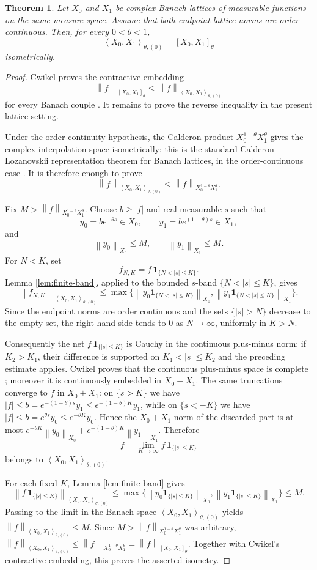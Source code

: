 \documentclass[11pt]{article}
\newtheorem{theorem}{Theorem}
\newcommand{\PM}{\left\langle X_0,X_1\right\rangle_{\theta,(0)}}
\newcommand{\Cplx}{\left[X_0,X_1\right]_\theta}
\newcommand{\Cal}{X_0^{1-\theta}X_1^\theta}
\newcommand{\norm}[1]{\left\lVert #1\right\rVert}
\newcommand{\one}{\mathbf 1}
\begin{document}
\begin{theorem}
\label{thm:order-continuous}
Let $X_0$ and $X_1$ be complex Banach lattices of measurable functions
on the same measure space.  Assume that both endpoint lattice norms are
order continuous.  Then, for every $0<\theta<1$,
\[
\left\langle X_0,X_1\right\rangle_{\theta,(0)}
=
\left[X_0,X_1\right]_\theta
\]
isometrically.
\end{theorem}

\begin{proof}
Cwikel proves the contractive embedding
\[
\norm{f}_{\Cplx}\le \norm{f}_{\PM}
\]
for every Banach couple \cite[Theorem 4.3]{Cwikel2015}.  It remains to
prove the reverse inequality in the present lattice setting.

Under the order-continuity hypothesis, the Calderon product
$\Cal$ gives the complex interpolation space isometrically; this is the
standard Calderon-Lozanovskii representation theorem for Banach
lattices, in the order-continuous case \cite{Calderon1964,Lozanovskii1969}.
It is therefore enough to prove
\[
\norm{f}_{\PM}\le \norm{f}_{\Cal}.
\]

Fix $M>\norm{f}_{\Cal}$.  Choose $b\ge |f|$ and real measurable $s$
such that
\[
y_0=b e^{-\theta s}\in X_0,\qquad
y_1=b e^{(1-\theta)s}\in X_1,
\]
and
\[
\norm{y_0}_{X_0}\le M,\qquad
\norm{y_1}_{X_1}\le M .
\]
For $N<K$, set
\[
f_{N,K}=f\,\one_{\{N<|s|\le K\}} .
\]
Lemma \ref{lem:finite-band}, applied to the bounded $s$-band
$\{N<|s|\le K\}$, gives
\[
\norm{f_{N,K}}_{\PM}
\le
\max\{\norm{y_0\one_{\{N<|s|\le K\}}}_{X_0},
      \norm{y_1\one_{\{N<|s|\le K\}}}_{X_1}\}.
\]
Since the endpoint norms are order continuous and the sets
$\{|s|>N\}$ decrease to the empty set, the right hand side tends to
$0$ as $N\to\infty$, uniformly in $K>N$.

Consequently the net $f\,\one_{\{|s|\le K\}}$ is Cauchy in the
continuous plus-minus norm: if $K_2>K_1$, their difference is supported
on $K_1<|s|\le K_2$ and the preceding estimate applies.  Cwikel proves
that the continuous plus-minus space is complete
\cite[Section 5]{Cwikel2015}; moreover it is continuously embedded in
$X_0+X_1$.  The same truncations converge to $f$ in $X_0+X_1$: on
$\{s>K\}$ we have $|f|\le b=e^{-(1-\theta)s}y_1\le
e^{-(1-\theta)K}y_1$, while on $\{s<-K\}$ we have
$|f|\le b=e^{\theta s}y_0\le e^{-\theta K}y_0$.  Hence the
$X_0+X_1$-norm of the discarded part is at most
$e^{-\theta K}\norm{y_0}_{X_0}+e^{-(1-\theta)K}\norm{y_1}_{X_1}$.
Therefore
\[
f=\lim_{K\to\infty} f\,\one_{\{|s|\le K\}}
\]
belongs to $\PM$.

For each fixed $K$, Lemma \ref{lem:finite-band} gives
\[
\norm{f\,\one_{\{|s|\le K\}}}_{\PM}
\le
\max\{\norm{y_0\one_{\{|s|\le K\}}}_{X_0},
      \norm{y_1\one_{\{|s|\le K\}}}_{X_1}\}
\le M .
\]
Passing to the limit in the Banach space $\PM$ yields
$\norm{f}_{\PM}\le M$.  Since $M>\norm{f}_{\Cal}$ was arbitrary,
$\norm{f}_{\PM}\le \norm{f}_{\Cal}=\norm{f}_{\Cplx}$.  Together with
Cwikel's contractive embedding, this proves the asserted isometry.
\end{proof}
\end{document}
